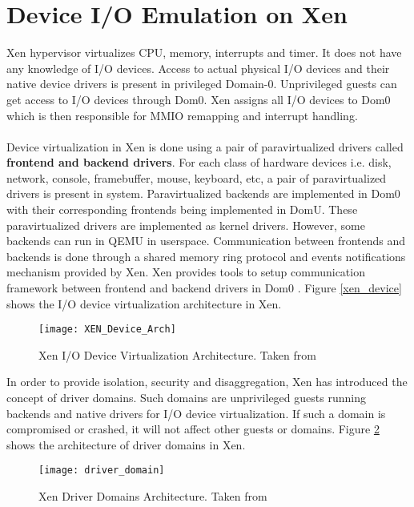 \section{Device I/O Emulation on Xen\label{sec:xendevice}}
Xen hypervisor virtualizes CPU, memory, interrupts and timer. It does not have any knowledge of I/O devices. Access to actual physical I/O devices and their native device drivers is present in privileged Domain-0. Unprivileged guests can get access to I/O devices through Dom0. Xen assigns all I/O devices to Dom0 which is then responsible for MMIO remapping and interrupt handling. \\
\\
Device virtualization in Xen is done using a pair of paravirtualized drivers called \textbf{frontend and backend drivers}. For each class of hardware devices i.e. disk, network, console, framebuffer, mouse, keyboard, etc, a pair of paravirtualized drivers is present in system. Paravirtualized backends are implemented in Dom0 with their corresponding frontends being implemented in DomU. These paravirtualized drivers are implemented as kernel drivers. However, some backends can run in QEMU in userspace. Communication between frontends and backends is done through a shared memory ring protocol and events notifications mechanism provided by Xen. Xen provides tools to setup communication framework between frontend and backend drivers in Dom0 \cite{xen_arm}. Figure \ref{xen_device} shows the I/O device virtualization architecture in Xen.

\begin{figure}[!htbp]
	\centering
	\texttt{[image: XEN\_Device\_Arch]}
	\caption{Xen I/O Device Virtualization Architecture. Taken from \cite{xen_arm}}
	\label{XEN_Device_Arch}
\end{figure}

In order to provide isolation, security and disaggregation, Xen has introduced the concept of driver domains. Such domains are unprivileged guests running backends and native drivers for I/O device virtualization. If such a domain is compromised or crashed, it will not affect other guests or domains. Figure \ref{driver_domain} shows the architecture of driver domains in Xen.

\begin{figure}[!htbp]
	\centering
	\texttt{[image: driver\_domain]}
	\caption{Xen Driver Domains Architecture. Taken from  \cite{xen_arm}}
	\label{driver_domain}
\end{figure}


